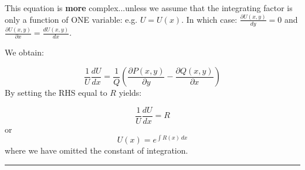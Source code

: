 This equation is \textbf{more} complex...unless we assume that the integrating factor is only a function of ONE variable: e.g. $U=U(x)$. In which case: $\frac{\partial U(x,y)}{dy} =0$ and $\frac{\partial U(x,y)}{\partial x}=\frac{d U(x,y)}{dx}$. 

We obtain:

\begin{equation}
\frac{1}{U}\frac{dU}{dx}=\frac{1}{Q}\left(\frac{\partial P(x,y)}{\partial y}-\frac{\partial Q(x,y)}{\partial x}\right)
\end{equation}
By setting the RHS equal to $R$ yields:

\begin{equation}
\frac{1}{U}\frac{dU}{dx}=R
\end{equation}
or
\begin{equation}
\boxed{U(x)=e^{\int R(x) \, dx}}
\end{equation}
where we have omitted the constant of integration.



\begin{center}
\noindent\rule{4cm}{0.4pt}
\end{center}

